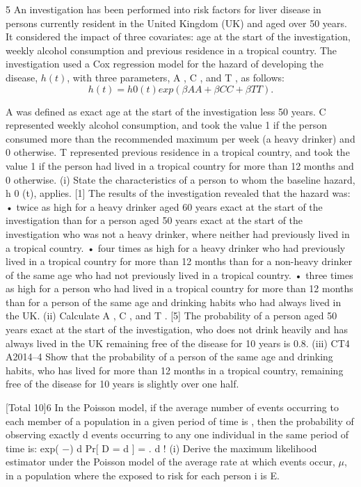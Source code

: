 \documentclass[a4paper,12pt]{article}
\begin{document}
\begin{enumerate}
5
An investigation has been performed into risk factors for liver disease in persons
currently resident in the United Kingdom (UK) and aged over 50 years. It considered
the impact of three covariates: age at the start of the investigation, weekly alcohol
consumption and previous residence in a tropical country.
The investigation used a Cox regression model for the hazard of developing the
disease, $h(t)$, with three parameters, \beta A , \beta C , and \beta T , as follows:
\[h ( t ) = h 0 ( t ) exp( \beta A A + \beta C C + \beta T T ).\]

A was defined as exact age at the start of the investigation less 50 years.
C represented weekly alcohol consumption, and took the value 1 if the person
consumed more than the recommended maximum per week (a heavy drinker) and 0
otherwise.
T represented previous residence in a tropical country, and took the value 1 if the
person had lived in a tropical country for more than 12 months and 0 otherwise.
(i)
State the characteristics of a person to whom the baseline hazard, h 0 (t),
applies.
[1]
The results of the investigation revealed that the hazard was:
• twice as high for a heavy drinker aged 60 years exact at the start of the
investigation than for a person aged 50 years exact at the start of the investigation
who was not a heavy drinker, where neither had previously lived in a tropical
country.
• four times as high for a heavy drinker who had previously lived in a tropical
country for more than 12 months than for a non-heavy drinker of the same age
who had not previously lived in a tropical country.
• three times as high for a person who had lived in a tropical country for more than
12 months than for a person of the same age and drinking habits who had always
lived in the UK.
(ii)
Calculate \beta A , \beta C , and \beta T .
[5]
The probability of a person aged 50 years exact at the start of the investigation, who
does not drink heavily and has always lived in the UK remaining free of the disease
for 10 years is 0.8.
(iii)
CT4 A2014–4
Show that the probability of a person of the same age and drinking habits, who
has lived for more than 12 months in a tropical country, remaining free of the
disease for 10 years is slightly over one half.

[Total 10]6
In the Poisson model, if the average number of events occurring to each member of a
population in a given period of time is \lambda, then the probability of observing exactly d
events occurring to any one individual in the same period of time is:
exp( −\lambda ) \lambda d
Pr[ D = d ] =
.
d !
(i)
Derive the maximum likelihood estimator under the Poisson model of the
average rate at which events occur, $\mu$, in a population where the exposed to
risk for each person i is E.


\end{enumerate}
\end{document}
